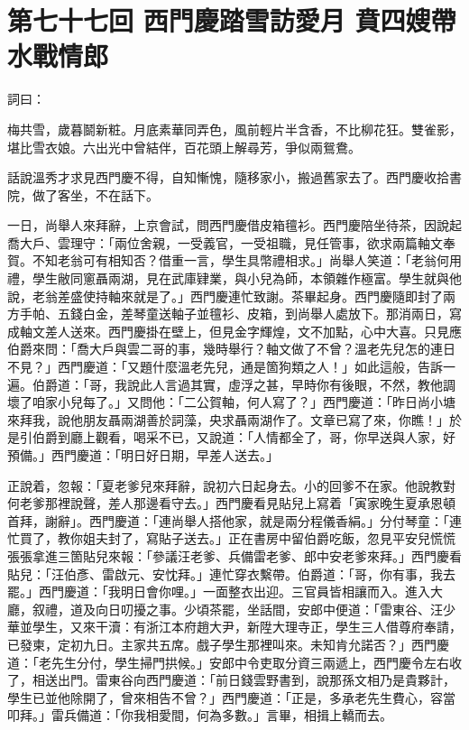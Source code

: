 
\chapter*{第七十七回 西門慶踏雪訪愛月 賁四嫂帶水戰情郎}


詞曰：

\begin{myquote} 
梅共雪，歲暮鬬新粧。月底素華同弄色，風前輕片半含香，不比柳花狂。雙雀影，堪比雪衣娘。六出光中曾結伴，百花頭上解尋芳，爭似兩鴛鴦。

\end{myquote} 

話說溫秀才求見西門慶不得，自知慚愧，隨移家小，搬過舊家去了。西門慶收拾書院，做了客坐，不在話下。

一日，尚舉人來拜辭，上京會試，問西門慶借皮箱氊衫。西門慶陪坐待茶，因說起喬大戶、雲理守：「兩位舍親，一受義官，一受祖職，見任管事，欲求兩篇軸文奉賀。不知老翁可有相知否？借重一言，學生具幣禮相求。」尚舉人笑道：「老翁何用禮，學生敝同窻聶兩湖，見在武庫肄業，與小兒為師，本領雜作極富。學生就與他說，老翁差盛使持軸來就是了。」西門慶連忙致謝。茶畢起身。西門慶隨即封了兩方手帕、五錢白金，差琴童送軸子並氊衫、皮箱，到尚舉人處放下。那消兩日，寫成軸文差人送來。西門慶掛在壁上，但見金字輝煌，文不加點，心中大喜。只見應伯爵來問：「喬大戶與雲二哥的事，幾時舉行？軸文做了不曾？溫老先兒怎的連日不見？」西門慶道：「又題什麼溫老先兒，通是箇狗類之人！」如此這般，告訴一遍。伯爵道：「哥，我說此人言過其實，虛浮之甚，早時你有後眼，不然，教他調壞了咱家小兒每了。」又問他：「二公賀軸，何人寫了？」西門慶道：「昨日尚小塘來拜我，說他朋友聶兩湖善於詞藻，央求聶兩湖作了。文章已寫了來，你瞧！」於是引伯爵到廳上觀看，喝采不已，又說道：「人情都全了，哥，你早送與人家，好預備。」西門慶道：「明日好日期，早差人送去。」

正說着，忽報：「夏老爹兒來拜辭，說初六日起身去。小的回爹不在家。他說教對何老爹那裡說聲，差人那邊看守去。」西門慶看見貼兒上寫着「寅家晚生夏承恩頓首拜，謝辭」。西門慶道：「連尚舉人搭他家，就是兩分程儀香絹。」分付琴童：「連忙買了，教你姐夫封了，寫貼子送去。」正在書房中留伯爵吃飯，忽見平安兒慌慌張張拿進三箇貼兒來報：「參議汪老爹、兵備雷老爹、郎中安老爹來拜。」西門慶看貼兒：「汪伯彥、雷啟元、安忱拜。」連忙穿衣繫帶。伯爵道：「哥，你有事，我去罷。」西門慶道：「我明日會你哩。」一面整衣出迎。三官員皆相讓而入。進入大廳，叙禮，道及向日叨擾之事。少頃茶罷，坐話間，安郎中便道：「雷東谷、汪少華並學生，又來干瀆：有浙江本府趙大尹，新陞大理寺正，學生三人借尊府奉請，已發柬，定初九日。主家共五席。戲子學生那裡叫來。未知肯允諾否？」西門慶道：「老先生分付，學生掃門拱候。」{}安郎中令吏取分資三兩遞上，西門慶令左右收了，相送出門。雷東谷向西門慶道：「前日錢雲野書到，說那孫文相乃是貴夥計，學生已並他除開了，曾來相告不曾？」西門慶道：「正是，多承老先生費心，容當叩拜。」雷兵備道：「你我相愛間，何為多數。」言畢，相揖上轎而去。

